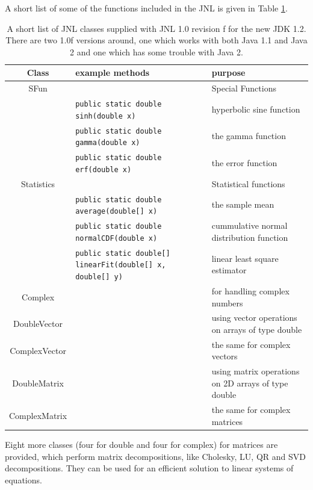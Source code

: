 A short list of some of the functions included in the JNL is
given in Table \ref{tab:JNL}.
\begin{table}
    \begin{tabular}{>{\large}c||>{\scriptsize}l|l}
      \textbf{Class}  & \normalsize\textbf{example methods} & \textbf{purpose} \\\hline\hline
      SFun &  & Special Functions \\
           & \verb|public static double sinh(double x)| & hyperbolic sine function \\
           & \verb|public static double gamma(double x)| & the gamma function \\
           & \verb|public static double erf(double x)| & the error function \\\hline
      Statistics &  & Statistical functions \\
           & \verb|public static double average(double[] x)| & the sample mean\\
           & \verb|public static double normalCDF(double x)| & 
                             cummulative normal distribution function\\
           & \verb|public static double[] linearFit(double[] x, double[] y)| &
                             linear least square estimator \\\hline
      Complex &  & for handling complex numbers \\\hline
      DoubleVector &  & using vector operations on arrays of type double\\
      ComplexVector & & the same for complex vectors \\\hline 
      DoubleMatrix &  & using matrix operations on 2D arrays of type double\\
      ComplexMatrix & & the same for complex matrices \\\hline 
    \end{tabular}
    \caption{A short list of JNL classes supplied with JNL 1.0 revision f %
      for the new JDK 1.2. There are two 1.0f versions around, one which %
      works with both Java 1.1 and Java 2 and one which has some trouble %
      with Java 2.}
    \label{tab:JNL}
\end{table}
Eight more classes (four for double and four for complex) for
matrices are provided, which perform matrix decompositions,
like Cholesky, LU, QR and SVD decompositions. They can be
used for an efficient solution to linear systems of equations.
 
